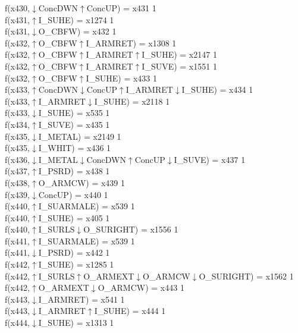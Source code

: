 f(x430,$\downarrow$ConcDWN$\uparrow$ConcUP) = x431 {1} \\
f(x431,$\uparrow$I\_SUHE) = x1274 {1} \\
f(x431,$\downarrow$O\_CBFW) = x432 {1} \\
f(x432,$\uparrow$O\_CBFW$\uparrow$I\_ARMRET) = x1308 {1} \\
f(x432,$\uparrow$O\_CBFW$\uparrow$I\_ARMRET$\uparrow$I\_SUHE) = x2147 {1} \\
f(x432,$\uparrow$O\_CBFW$\uparrow$I\_ARMRET$\uparrow$I\_SUVE) = x1551 {1} \\
f(x432,$\uparrow$O\_CBFW$\uparrow$I\_SUHE) = x433 {1} \\
f(x433,$\uparrow$ConcDWN$\downarrow$ConcUP$\uparrow$I\_ARMRET$\downarrow$I\_SUHE) = x434 {1} \\
f(x433,$\uparrow$I\_ARMRET$\downarrow$I\_SUHE) = x2118 {1} \\
f(x433,$\downarrow$I\_SUHE) = x535 {1} \\
f(x434,$\uparrow$I\_SUVE) = x435 {1} \\
f(x435,$\downarrow$I\_METAL) = x2149 {1} \\
f(x435,$\downarrow$I\_WHIT) = x436 {1} \\
f(x436,$\downarrow$I\_METAL$\downarrow$ConcDWN$\uparrow$ConcUP$\downarrow$I\_SUVE) = x437 {1} \\
f(x437,$\uparrow$I\_PSRD) = x438 {1} \\
f(x438,$\uparrow$O\_ARMCW) = x439 {1} \\
f(x439,$\downarrow$ConcUP) = x440 {1} \\
f(x440,$\uparrow$I\_SUARMALE) = x539 {1} \\
f(x440,$\uparrow$I\_SUHE) = x405 {1} \\
f(x440,$\uparrow$I\_SURLS$\downarrow$O\_SURIGHT) = x1556 {1} \\
f(x441,$\uparrow$I\_SUARMALE) = x539 {1} \\
f(x441,$\downarrow$I\_PSRD) = x442 {1} \\
f(x442,$\uparrow$I\_SUHE) = x1285 {1} \\
f(x442,$\uparrow$I\_SURLS$\uparrow$O\_ARMEXT$\downarrow$O\_ARMCW$\downarrow$O\_SURIGHT) = x1562 {1} \\
f(x442,$\uparrow$O\_ARMEXT$\downarrow$O\_ARMCW) = x443 {1} \\
f(x443,$\downarrow$I\_ARMRET) = x541 {1} \\
f(x443,$\downarrow$I\_ARMRET$\uparrow$I\_SUHE) = x444 {1} \\
f(x444,$\downarrow$I\_SUHE) = x1313 {1} \\
